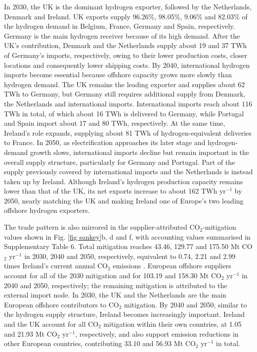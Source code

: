 \documentclass[pdflatex,lineno,sn-mathphys,Numbered]{sn-jnl}%
\begin{document}
In 2030, the UK is the dominant hydrogen exporter, followed by the Netherlands, Denmark and Ireland. UK exports supply 96.26\%, 98.05\%, 9.06\% and 82.03\% of the hydrogen demand in Belgium, France, Germany and Spain, respectively. Germany is the main hydrogen receiver because of its high demand. After the UK's contribution, Denmark and the Netherlands supply about 19 and 37 TWh of Germany's imports, respectively, owing to their lower production costs, closer locations and consequently lower shipping costs. By 2040, international hydrogen imports become essential because offshore capacity grows more slowly than hydrogen demand. The UK remains the leading exporter and supplies about 62 TWh to Germany, but Germany still requires additional supply from Denmark, the Netherlands and international imports. International imports reach about 116 TWh in total, of which about 16 TWh is delivered to Germany, while Portugal and Spain import about 17 and 80 TWh, respectively. At the same time, Ireland's role expands, supplying about 81 TWh of hydrogen-equivalent deliveries to France. In 2050, as electrification approaches its later stage and hydrogen-demand growth slows, international imports decline but remain important in the overall supply structure, particularly for Germany and Portugal. Part of the supply previously covered by international imports and the Netherlands is instead taken up by Ireland. Although Ireland's hydrogen production capacity remains lower than that of the UK, its net exports increase to about 162 TWh yr$^{-1}$ by 2050, nearly matching the UK and making Ireland one of Europe's two leading offshore hydrogen exporters.

The trade pattern is also mirrored in the supplier-attributed CO$_2$-mitigation values shown in Fig. \ref{fig sankey}b, d and f, with accounting values summarised in Supplementary Table 6. Total mitigation reaches 43.46, 129.77 and 175.50 Mt CO$_2$ yr$^{-1}$ in 2030, 2040 and 2050, respectively, equivalent to 0.74, 2.21 and 2.99 times Ireland's current annual CO$_2$ emissions \cite{COemissions}. European offshore suppliers account for all of the 2030 mitigation and for 103.19 and 158.30 Mt CO$_2$ yr$^{-1}$ in 2040 and 2050, respectively; the remaining mitigation is attributed to the external import node. In 2030, the UK and the Netherlands are the main European offshore contributors to CO$_2$ mitigation. By 2040 and 2050, similar to the hydrogen supply structure, Ireland becomes increasingly important. Ireland and the UK account for all CO$_2$ mitigation within their own countries, at 1.05 and 21.93 Mt CO$_2$ yr$^{-1}$, respectively, and also support emission reductions in other European countries, contributing 33.10 and 56.93 Mt CO$_2$ yr$^{-1}$ in total.
\end{document}

